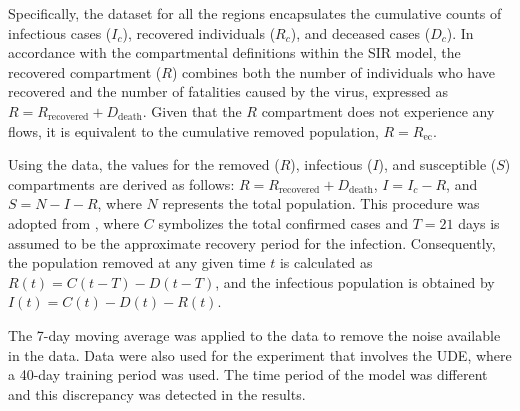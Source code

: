 \documentclass[12pt]{article}
\begin{document}
Specifically, the dataset for all the regions encapsulates the cumulative counts of infectious cases (\(I_c\)), recovered individuals (\(R_c\)), and deceased cases (\(D_c\)). In accordance with the compartmental definitions within the SIR model, the recovered compartment (\(R\)) combines both the number of individuals who have recovered and the number of fatalities caused by the virus, expressed as \(R = R_{\text{recovered}} + D_{\text{death}}\). Given that the \(R\) compartment does not experience any flows, it is equivalent to the cumulative removed population, \(R = R_{\text{ec}}\).

Using the data, the values for the removed (\(R\)), infectious (\(I\)), and susceptible (\(S\)) compartments are derived as follows: \(R = R_{\text{recovered}} + D_{\text{death}}\), \(I = I_c - R\), and \(S = N - I - R\), where \(N\) represents the total population. This procedure was adopted from  \cite{amaral2021towards}, where \(C\) symbolizes the total confirmed cases and \(T = 21\) days is assumed to be the approximate recovery period for the infection. Consequently, the population removed at any given time \(t\) is calculated as \(R(t) = C(t - T) - D(t - T)\), and the infectious population is obtained by \(I(t) = C(t) - D(t) - R(t)\). 

The 7-day moving average was applied to the data to remove the noise available in the data. Data were also used for the experiment that involves the UDE, where a 40-day training period was used. The time period of the model was different and this discrepancy was detected in the results.
\end{document}
